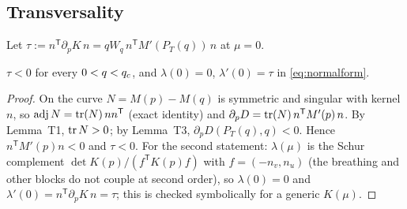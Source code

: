 \subsection{Transversality}

Let $\tau:=n^{\mathsf T}\partial_pK\,n=qW_q\,n^{\mathsf T}M'(P_T(q))\,n$ at $\mu=0$.

\begin{lemma}[transversality]\label{lem:tau}
$\tau<0$ for every $0<q<q_{c}$, and $\lambda(0)=0$, $\lambda'(0)=\tau$ in \eqref{eq:normalform}.
\end{lemma}
\begin{proof}
On the curve $N=M(p)-M(q)$ is symmetric and singular with kernel $n$, so $\operatorname{adj} N=\operatorname{tr}(N)\,nn^{\mathsf T}$ (exact
identity) and $\partial_pD=\operatorname{tr}(N)\,n^{\mathsf T}M'(p)\,n$. By Lemma~T1, $\operatorname{tr} N>0$; by Lemma~T3, $\partial_pD(P_T(q),q)<0$.
Hence $n^{\mathsf T}M'(p)n<0$ and $\tau<0$. For the second statement: $\lambda(\mu)$ is the Schur complement
$\det K(p)/(f^{\mathsf T}K(p)f)$ with $f=(-n_v,n_u)$ (the breathing and other blocks do not couple at second order), so
$\lambda(0)=0$ and $\lambda'(0)=n^{\mathsf T}\partial_pK\,n=\tau$; this is checked symbolically for a generic $K(\mu)$.
\end{proof}
